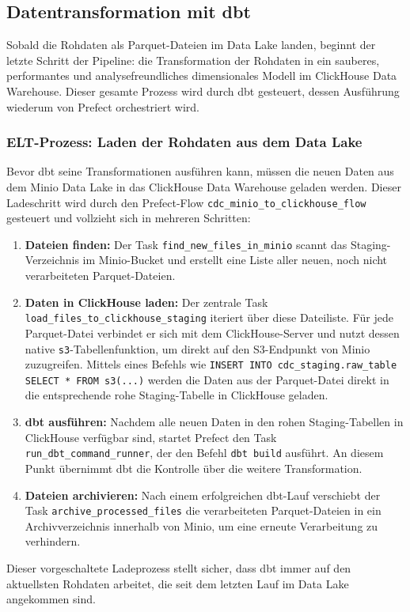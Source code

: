 \documentclass[
    12pt,               
    a4paper,        
    ngerman            
]{scrartcl}
\begin{document}
\subsection{Datentransformation mit dbt}
\label{sec:dbt_transformation}

Sobald die Rohdaten als Parquet-Dateien im Data Lake landen, beginnt der letzte Schritt der Pipeline: die Transformation der Rohdaten in ein sauberes, performantes und analysefreundliches dimensionales Modell im ClickHouse Data Warehouse. Dieser gesamte Prozess wird durch dbt gesteuert, dessen Ausführung wiederum von Prefect orchestriert wird.

\subsubsection{ELT-Prozess: Laden der Rohdaten aus dem Data Lake}
\label{sssec:elt_prozess}
Bevor dbt seine Transformationen ausführen kann, müssen die neuen Daten aus dem Minio Data Lake in das ClickHouse Data Warehouse geladen werden. Dieser Ladeschritt wird durch den Prefect-Flow \texttt{cdc\_minio\_to\_clickhouse\_flow} gesteuert und vollzieht sich in mehreren Schritten:
\begin{enumerate}
    \item \textbf{Dateien finden:} Der Task \texttt{find\_new\_files\_in\_minio} scannt das Staging-Verzeichnis im Minio-Bucket und erstellt eine Liste aller neuen, noch nicht verarbeiteten Parquet-Dateien.
    \item \textbf{Daten in ClickHouse laden:} Der zentrale Task \texttt{load\_files\_to\_clickhouse\_staging} iteriert über diese Dateiliste. Für jede Parquet-Datei verbindet er sich mit dem ClickHouse-Server und nutzt dessen native \texttt{s3}-Tabellenfunktion, um direkt auf den S3-Endpunkt von Minio zuzugreifen. Mittels eines Befehls wie \texttt{INSERT INTO cdc\_staging.raw\_table SELECT * FROM s3(...)} werden die Daten aus der Parquet-Datei direkt in die entsprechende rohe Staging-Tabelle in ClickHouse geladen.
    \item \textbf{dbt ausführen:} Nachdem alle neuen Daten in den rohen Staging-Tabellen in ClickHouse verfügbar sind, startet Prefect den Task \texttt{run\_dbt\_command\_runner}, der den Befehl \texttt{dbt build} ausführt. An diesem Punkt übernimmt dbt die Kontrolle über die weitere Transformation.
    \item \textbf{Dateien archivieren:} Nach einem erfolgreichen dbt-Lauf verschiebt der Task \texttt{archive\_processed\_files} die verarbeiteten Parquet-Dateien in ein Archivverzeichnis innerhalb von Minio, um eine erneute Verarbeitung zu verhindern.
\end{enumerate}
Dieser vorgeschaltete Ladeprozess stellt sicher, dass dbt immer auf den aktuellsten Rohdaten arbeitet, die seit dem letzten Lauf im Data Lake angekommen sind.
\end{document}
